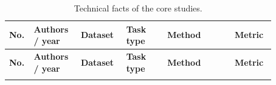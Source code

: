 \documentclass[11pt,a4paper]{article}
\begin{document}
\begin{longtable}{
>{\RaggedRight\arraybackslash}p{0.035\linewidth}
>{\RaggedRight\arraybackslash}p{0.155\linewidth}
>{\RaggedRight\arraybackslash}p{0.155\linewidth}
>{\RaggedRight\arraybackslash}p{0.145\linewidth}
>{\RaggedRight\arraybackslash}p{0.235\linewidth}
>{\RaggedRight\arraybackslash}p{0.145\linewidth}
}
\caption{Technical facts of the core studies.}
\label{tab:core_facts}\\

\toprule
\textbf{No.} &
\textbf{Authors / year} &
\textbf{Dataset} &
\textbf{Task type} &
\textbf{Method} &
\textbf{Metric} \\
\midrule
\endfirsthead

\toprule
\textbf{No.} &
\textbf{Authors / year} &
\textbf{Dataset} &
\textbf{Task type} &
\textbf{Method} &
\textbf{Metric} \\
\midrule
\endhead

\bottomrule
\endfoot


\end{longtable}
\end{document}
